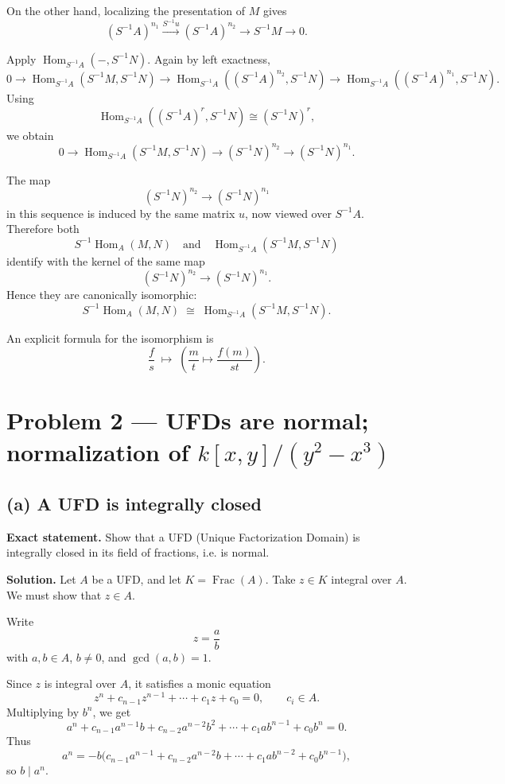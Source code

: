 \documentclass[12pt,a4paper,oneside]{report}
\theoremstyle{notespace}
\begin{document}
On the other hand, localizing the presentation of \(M\) gives
\[
(S^{-1}A)^{n_1}\xrightarrow{S^{-1}u}(S^{-1}A)^{n_2}\to S^{-1}M\to 0.
\]

Apply \(\operatorname{Hom}_{S^{-1}A}(-,S^{-1}N)\). Again by left exactness,
\[
0\to \operatorname{Hom}_{S^{-1}A}(S^{-1}M,S^{-1}N)\to
\operatorname{Hom}_{S^{-1}A}((S^{-1}A)^{n_2},S^{-1}N)\to
\operatorname{Hom}_{S^{-1}A}((S^{-1}A)^{n_1},S^{-1}N).
\]
Using
\[
\operatorname{Hom}_{S^{-1}A}((S^{-1}A)^r,S^{-1}N)\cong (S^{-1}N)^r,
\]
we obtain
\[
0\to \operatorname{Hom}_{S^{-1}A}(S^{-1}M,S^{-1}N)\to
(S^{-1}N)^{n_2}\to (S^{-1}N)^{n_1}.
\]

The map
\[
(S^{-1}N)^{n_2}\to (S^{-1}N)^{n_1}
\]
in this sequence is induced by the same matrix \(u\), now viewed over \(S^{-1}A\). Therefore both
\[
S^{-1}\operatorname{Hom}_A(M,N)
\quad\text{and}\quad
\operatorname{Hom}_{S^{-1}A}(S^{-1}M,S^{-1}N)
\]
identify with the kernel of the same map
\[
(S^{-1}N)^{n_2}\to (S^{-1}N)^{n_1}.
\]
Hence they are canonically isomorphic:
\[
S^{-1}\!\operatorname{Hom}_A(M,N)\;\cong\;\operatorname{Hom}_{S^{-1}A}(S^{-1}M,S^{-1}N).
\]

An explicit formula for the isomorphism is
\[
\frac{f}{s}\;\longmapsto\;\left(\frac{m}{t}\mapsto \frac{f(m)}{st}\right).
\]

\bigskip

\section{Problem 2 --- UFDs are normal; normalization of \texorpdfstring{$k[x,y]/(y^2-x^3)$}{k[x,y]/(y\string^2-x\string^3)}}

\subsection*{(a) A UFD is integrally closed}

\textbf{Exact statement.}
Show that a UFD (Unique Factorization Domain) is integrally closed in its field of fractions, i.e. is normal.

\textbf{Solution.}
Let \(A\) be a UFD, and let \(K=\operatorname{Frac}(A)\). Take \(z\in K\) integral over \(A\). We must show that \(z\in A\).

Write
\[
z=\frac{a}{b}
\]
with \(a,b\in A\), \(b\neq 0\), and \(\gcd(a,b)=1\).

Since \(z\) is integral over \(A\), it satisfies a monic equation
\[
z^n+c_{n-1}z^{n-1}+\cdots+c_1z+c_0=0,
\qquad c_i\in A.
\]
Multiplying by \(b^n\), we get
\[
a^n+c_{n-1}a^{n-1}b+c_{n-2}a^{n-2}b^2+\cdots+c_1ab^{n-1}+c_0b^n=0.
\]
Thus
\[
a^n=-b\big(c_{n-1}a^{n-1}+c_{n-2}a^{n-2}b+\cdots+c_1ab^{n-2}+c_0b^{n-1}\big),
\]
so \(b\mid a^n\).
\end{document}
